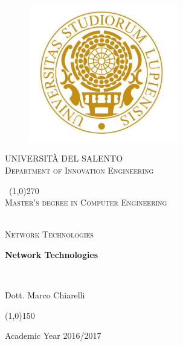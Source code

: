 \documentclass[11 pt,a4paper,twoside,openany]{book}
\begin{document}
\pagestyle{fancy}
\fancyhead{}
\fancyfoot{}
\fancyfoot[R]{\thepage}
\renewcommand{\headrulewidth}{0pt}
\renewcommand{\footrulewidth}{0.1pt}

\newpage	
\begin{titlepage}
\begin{center}
	
\begin{figure}
	\centering
	\includegraphics[height=6cm]{unigold.jpg}
\end{figure}		

\begin{center}
\begin{LARGE}
	\textsc{UNIVERSIT\`A DEL SALENTO}\\
	[0.2cm]
	\textsc{Department of Innovation Engineering}
\end{LARGE}
\end{center}	
	
	\
	\line(1,0){270} \\
	[0.25cm]
	
	\textsc{Master's degree in Computer Engineering}\
	
	\textsl{}\\
	[1cm]
	\textsc{Network Technologies}\
	
	\bigskip 
	\huge{\bfseries Network Technologies}\

	
	\bigskip
	\textsl{}\\
	[2cm]
	


\begin{LARGE}
	
	Dott. Marco Chiarelli
	
\end{LARGE}

\vspace{5cm}
	
\line(1,0){150} \\
\begin{small}
	Academic Year 2016/2017 \\
\end{small}
\end{center}
\end{titlepage}
\end{document}
